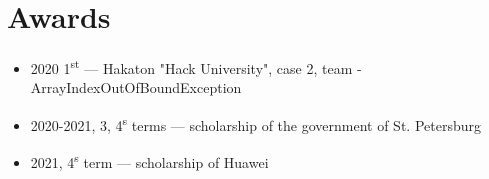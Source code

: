 \documentclass[letter]{deedy-resume}
\begin{document}
\begin{minipage}[t]{0.6\textwidth}
        \sectionspace %


        \section{Awards}

        \begin{itemize}[leftmargin=1em]
            \setlength\itemsep{0em}
            \item 2020 1\textsuperscript{st} --- Hakaton "Hack University", case 2, team - ArrayIndexOutOfBoundException
            \item 2020-2021, {3, 4}\textsuperscript{s} terms --- scholarship of the government of St. Petersburg
            \item 2021, 4\textsuperscript{s} term --- scholarship of Huawei
        \end{itemize}

        \sectionspace %

    \end{minipage} %
\end{document}

